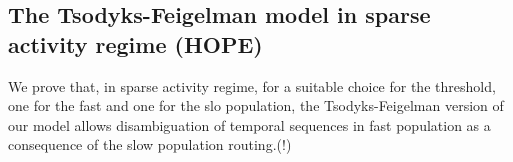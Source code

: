 \clearpage
\subsection{The Tsodyks-Feigelman model in sparse activity regime (HOPE)}
We prove that, in sparse activity regime, for a suitable choice for the threshold, one for the fast and one for the slo population, the Tsodyks-Feigelman version of our model allows disambiguation of temporal sequences in fast population as a consequence of the slow population routing.(!)



